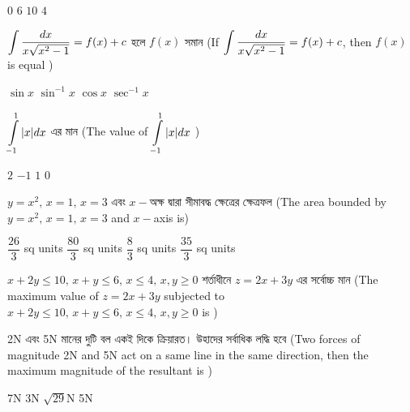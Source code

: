 \documentclass[addpoints]{exam}
\begin{document}
\begin{questions}
\begin{oneparchoices}
\choice $ 0 $
\choice $ 6 $
\choice $ 10 $
\choice $ 4 $

\end{oneparchoices}

\question  $ \mathlarger{\int \dfrac{dx}{x\sqrt{x^2 -1}} = f(x)+c} $  হলে $ f(x) $ সমান (If $ \mathlarger{\int \dfrac{dx}{x\sqrt{x^2 -1}} = f(x)+c} $, then $f(x)$ is equal ) 

\begin{oneparchoices}
\choice $ \sin x $
\choice $ \sin^{-1}x $
\choice $ \cos x $
\choice $ \sec^{-1} x $

\end{oneparchoices}


\question $ \mathlarger{\int\limits_{-1}^{1}|x|dx} $ এর মান (The value of $ \mathlarger{\int\limits_{-1}^{1}|x|dx} $ ) 

\begin{oneparchoices}
\choice $ 2 $
\choice $ -1 $
\choice $ 1 $
\choice $ 0 $

\end{oneparchoices}

\question $ y=x^2,\,x=1,\,x=3 $ এবং $ x- $অক্ষ দ্বারা সীমাবদ্ধ ক্ষেত্রের ক্ষেত্রফল (The area bounded by $ y=x^2,\,x=1,\,x=3 $ and $ x- $axis is)

\begin{oneparchoices}
\choice $ \dfrac{26}{3} $ sq units
\choice $ \dfrac{80}{3} $ sq units
\choice $ \dfrac{8}{3} $ sq units
\choice $ \dfrac{35}{3} $ sq units

\end{oneparchoices}

\question   $ x+2y\le 10,\, x+y\le 6,\, x\le 4,\, x,y\ge 0 $ শর্তাধীনে $ z= 2x+3y $ এর সর্বোচ্চ মান (The maximum value of $ z= 2x+3y $ subjected to $ x+2y\le 10,\, x+y\le 6,\, x\le 4,\, x,y\ge 0 $ is )

\begin{oneparchoices}

\end{oneparchoices}

\question   2N এবং 5N  মানের দুটি বল একই দিকে ক্রিয়ারত। উহাদের সর্বাধিক  লদ্ধি হবে (Two forces of magnitude 2N and 5N act on a same line in the same direction, then the maximum magnitude of the resultant is )

\begin{oneparchoices}
\choice 7N
\choice 3N
\choice $\sqrt{29}$N
\choice 5N


\end{oneparchoices}
\end{questions}
\end{document}
